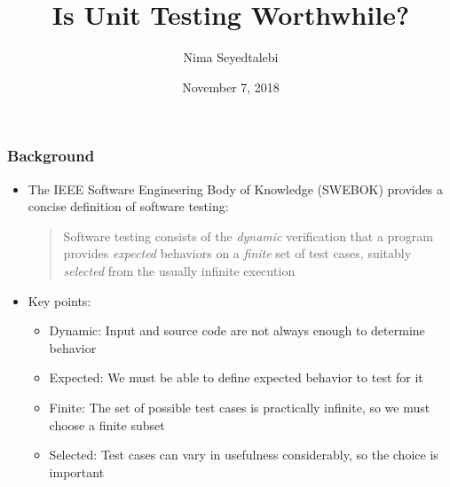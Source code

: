 \documentclass{beamer}
\begin{document}
\author{Nima Seyedtalebi}
\title{Is Unit Testing Worthwhile?}
\date{November 7, 2018}

\begin{frame}[plain]
\maketitle
\end{frame}

\begin{frame}
\frametitle{Background}
\begin{itemize}
	\item The IEEE Software Engineering Body of Knowledge (SWEBOK) provides a concise definition of software testing:
	
		\blockcquote{SWEBOK}{Software testing consists of the \textit{dynamic} verification that a program provides \textit{expected} behaviors on a \textit{finite} set of test cases, suitably \textit{selected} from the usually infinite execution}
 	\item Key points:
	\begin{itemize}
 		\item Dynamic: Input and source code are not always enough to determine behavior
		\item Expected: We must be able to define expected behavior to test for it
 		\item Finite: The set of possible test cases is practically infinite, so we must choose a finite subset
 		\item Selected: Test cases can vary in usefulness considerably, so the choice is important
	\end{itemize}
\end{itemize}
\end{frame}
\end{document}
